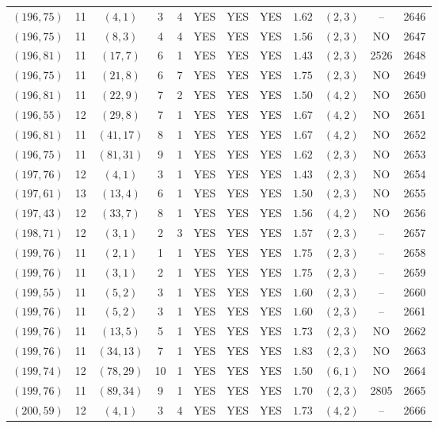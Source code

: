 \begin{longtable}{|c|c|c|c|c|c|c|c|c|c|c|c|}
$(196,75)$ & 11 & $(4,1)$ & 3 & 4 & YES & YES & YES & $1.62$ & $(2,3)$ & -- & 2646\\
$(196,75)$ & 11 & $(8,3)$ & 4 & 4 & YES & YES & YES & $1.56$ & $(2,3)$ & NO & 2647\\
$(196,81)$ & 11 & $(17,7)$ & 6 & 1 & YES & YES & YES & $1.43$ & $(2,3)$ & 2526 & 2648\\
$(196,75)$ & 11 & $(21,8)$ & 6 & 7 & YES & YES & YES & $1.75$ & $(2,3)$ & NO & 2649\\
$(196,81)$ & 11 & $(22,9)$ & 7 & 2 & YES & YES & YES & $1.50$ & $(4,2)$ & NO & 2650\\
$(196,55)$ & 12 & $(29,8)$ & 7 & 1 & YES & YES & YES & $1.67$ & $(4,2)$ & NO & 2651\\
$(196,81)$ & 11 & $(41,17)$ & 8 & 1 & YES & YES & YES & $1.67$ & $(4,2)$ & NO & 2652\\
$(196,75)$ & 11 & $(81,31)$ & 9 & 1 & YES & YES & YES & $1.62$ & $(2,3)$ & NO & 2653\\
$(197,76)$ & 12 & $(4,1)$ & 3 & 1 & YES & YES & YES & $1.43$ & $(2,3)$ & NO & 2654\\
$(197,61)$ & 13 & $(13,4)$ & 6 & 1 & YES & YES & YES & $1.50$ & $(2,3)$ & NO & 2655\\
$(197,43)$ & 12 & $(33,7)$ & 8 & 1 & YES & YES & YES & $1.56$ & $(4,2)$ & NO & 2656\\
$(198,71)$ & 12 & $(3,1)$ & 2 & 3 & YES & YES & YES & $1.57$ & $(2,3)$ & -- & 2657\\
$(199,76)$ & 11 & $(2,1)$ & 1 & 1 & YES & YES & YES & $1.75$ & $(2,3)$ & -- & 2658\\
$(199,76)$ & 11 & $(3,1)$ & 2 & 1 & YES & YES & YES & $1.75$ & $(2,3)$ & -- & 2659\\
$(199,55)$ & 11 & $(5,2)$ & 3 & 1 & YES & YES & YES & $1.60$ & $(2,3)$ & -- & 2660\\
$(199,76)$ & 11 & $(5,2)$ & 3 & 1 & YES & YES & YES & $1.60$ & $(2,3)$ & -- & 2661\\
$(199,76)$ & 11 & $(13,5)$ & 5 & 1 & YES & YES & YES & $1.73$ & $(2,3)$ & NO & 2662\\
$(199,76)$ & 11 & $(34,13)$ & 7 & 1 & YES & YES & YES & $1.83$ & $(2,3)$ & NO & 2663\\
$(199,74)$ & 12 & $(78,29)$ & 10 & 1 & YES & YES & YES & $1.50$ & $(6,1)$ & NO & 2664\\
$(199,76)$ & 11 & $(89,34)$ & 9 & 1 & YES & YES & YES & $1.70$ & $(2,3)$ & 2805 & 2665\\
$(200,59)$ & 12 & $(4,1)$ & 3 & 4 & YES & YES & YES & $1.73$ & $(4,2)$ & -- & 2666\\

\end{longtable}
